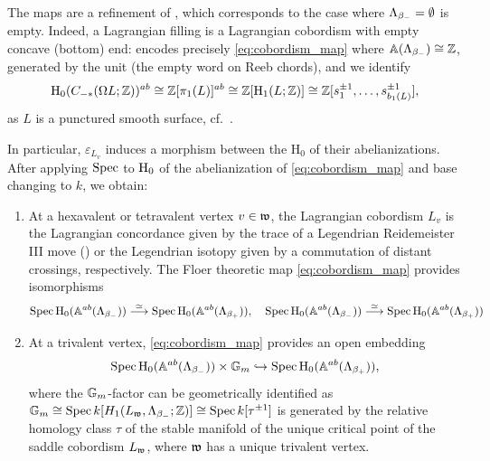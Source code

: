 \begin{example} The maps  are a refinement of , which corresponds to the case where $\Lambda_{\beta_-}=\emptyset$ is empty. Indeed, a Lagrangian filling is a Lagrangian cobordism with empty concave (bottom) end:  encodes precisely \eqref{eq:cobordism_map} where $\mathbb{A}(\Lambda_{\beta_-})\cong \mathbb{Z}$, generated by the unit (the empty word on Reeb chords), and we identify
$$\operatorname{H}_0(C_{-*}(\Omega L;\mathbb{Z}))^{ab}\cong\mathbb{Z}[\pi_1(L)]^{ab}\cong\mathbb{Z}[\operatorname{H}_1(L;\mathbb{Z})]\cong\mathbb{Z}[s_1^{\pm1},\ldots,s^{\pm1}_{b_1(L)}],$$
as $L$ is a punctured smooth surface, cf.~\cite{EkholmLekili2023}.\sbs    
\end{example}
\noindent In particular, $\varepsilon_{L_v}$ induces a morphism between the $\mbox{H}_0$ of their abelianizations. After applying $\operatorname{Spec}$ to $\operatorname{H}_0$ of the abelianization of \eqref{eq:cobordism_map} and base changing to $k$, we obtain:
\begin{enumerate}
    \item At a hexavalent or tetravalent vertex $v\in\mathfrak{w}$, the Lagrangian cobordism $L_v$ is the Lagrangian concordance given by the trace of a Legendrian Reidemeister III move () or the Legendrian isotopy given by a commutation of distant crossings, respectively. The Floer theoretic map \eqref{eq:cobordism_map} provides isomorphisms
    \begin{equation}\label{eq:Floer_maps_iso}\operatorname{Spec}\mbox{H}_0(\mathbb{A}^{ab}(\Lambda_{\beta_-}))\stackrel{\simeq}{\longrightarrow} \operatorname{Spec}\mbox{H}_0(\mathbb{A}^{ab}(\Lambda_{\beta_+})),\quad \operatorname{Spec}\mbox{H}_0(\mathbb{A}^{ab}(\Lambda_{\beta_-}))\stackrel{\simeq}{\longrightarrow} \operatorname{Spec}\mbox{H}_0(\mathbb{A}^{ab}(\Lambda_{\beta_+}))
    \end{equation}

    \item At a trivalent vertex, \eqref{eq:cobordism_map} provides an open embedding \begin{equation}\label{eq:Floer_inclusion_trivalent}
        \operatorname{Spec}\mbox{H}_0(\mathbb{A}^{ab}(\Lambda_{\beta_-}))\times\mathbb{G}_m\hookrightarrow \operatorname{Spec}\mbox{H}_0(\mathbb{A}^{ab}(\Lambda_{\beta_+})),
    \end{equation}
    where the $\mathbb{G}_m$-factor can be geometrically identified as $\mathbb{G}_m\cong \operatorname{Spec} k[H_1(L_{\mathfrak{w}},\Lambda_{\beta_-};\mathbb{Z})]\cong \operatorname{Spec} k[\tau^{\pm1}]$ is generated by the relative homology class $\tau$ of the stable manifold of the unique critical point of the saddle cobordism $L_{\mathfrak{w}}$, where $\mathfrak{w}$ has a unique trivalent vertex.
 \end{enumerate}

